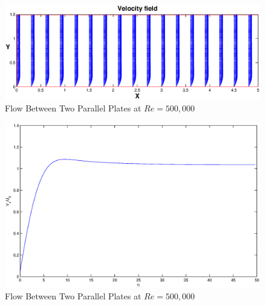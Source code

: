 \begin{figure}
\label{blasiusvp}
\begin{center}
\includegraphics[scale=.4]{blasiusvp.eps}
\end{center}
\caption{Flow Between Two Parallel Plates at $Re = 500,000$}
\end{figure}

\begin{figure}
\label{blasius5}
\begin{center}
\includegraphics[scale=.4]{blasius.eps}
\end{center}
\caption{Flow Between Two Parallel Plates at $Re = 500,000$}
\end{figure}

